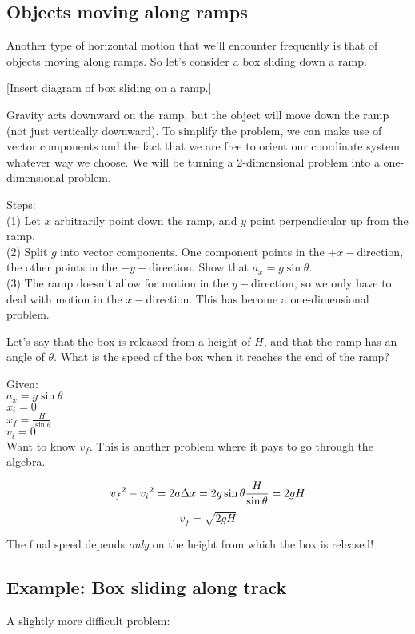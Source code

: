 \subsection{Objects moving along ramps}
Another type of horizontal motion that we'll encounter frequently is that of objects moving along ramps. So let's consider a box sliding down a ramp.

[Insert diagram of box sliding on a ramp.]
\vspace{4cm}

Gravity acts downward on the ramp, but the object will move down the ramp (not just vertically downward). To simplify the problem, we can make use of vector components and the fact that we are free to orient our coordinate system whatever way we choose. We will be turning a 2-dimensional problem into a one-dimensional problem.

Steps:\\
(1) Let $x$ arbitrarily point down the ramp, and $y$ point perpendicular up from the ramp.\\
(2) Split $g$ into vector components. One component points in the $+x-$direction, the other points in the $-y-$direction. Show that $a_x=g\sin\theta$.\\
(3) The ramp doesn't allow for motion in the $y-$direction, so we only have to deal with motion in the $x-$direction. This has become a one-dimensional problem.

Let's say that the box is released from a height of $H$, and that the ramp has an angle of $\theta$. What is the speed of the box when it reaches the end of the ramp?

Given:\\
$a_x=g\sin\theta$\\
$x_i=0$\\
$x_f=\frac{H}{\sin\theta}$\\
$v_i=0$\\

Want to know $v_f$. This is another problem where it pays to go through the algebra.

$$v_f\displaystyle^2-v_i\displaystyle^2=2a\Delta{x}=2g\sin\theta\frac{H}{\sin\theta}=2gH$$
$$v_f=\sqrt{2gH}$$

The final speed depends \textit{only} on the height from which the box is released!

\subsection{Example: Box sliding along track}
A slightly more difficult problem:

